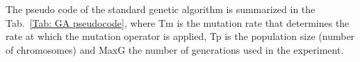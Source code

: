 \documentclass[10pt]{article}
\begin{document}
The pseudo code of the standard genetic algorithm is summarized in the Tab.~\ref{Tab: GA pseudocode}, where Tm is the mutation rate that determines the rate at which the mutation operator is applied, Tp is the population size (number of
chromosomes) and MaxG the number of generations used in the experiment\cite{venti}.
\end{document}
